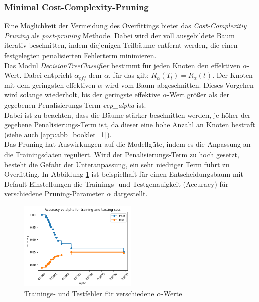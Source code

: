 
\subsubsection{Minimal Cost-Complexity-Pruning}
Eine Möglichkeit der Vermeidung des Overfittings bietet das \emph{Cost-Complexitiy Pruning} als \emph{post-pruning} Methode. Dabei wird der voll ausgebildete Baum iterativ beschnitten, indem diejenigen Teilbäume entfernt werden, die einen festgelegten penalisierten Fehlerterm minimieren.\\
\noindent \hspace*{7mm}
Das Modul \emph{DecisionTreeClassifier} bestimmt für jeden Knoten den effektiven $\alpha$-Wert. Dabei entpricht $\alpha_{eff}$ dem $\alpha$, für das gilt: $R_{\alpha}(T_{t})=R_{\alpha}(t)$. Der Knoten mit dem geringsten effektiven $\alpha$ wird vom Baum abgeschnitten. Dieses Vorgehen wird solange wiederholt, bis der geringste effektive $\alpha$-Wert größer als der gegebenen Penalisierungs-Term \emph{ccp\_alpha} ist.\\
\noindent \hspace*{7mm}
Dabei ist zu beachten, dass die Bäume stärker beschnitten werden, je höher der gegebene Penalisierungs-Term ist, da dieser eine hohe Anzahl an Knoten bestraft (siehe auch \ref{app:abb_booklet_1}).\\
\noindent \hspace*{7mm}
Das Pruning hat Auswirkungen auf die Modellgüte, indem es die Anpassung an die Trainingsdaten reguliert. Wird der Penalisierungs-Term zu hoch gesetzt, besteht die Gefahr der Unteranpassung, ein sehr niedriger Term führt zu Overfitting. In Abbildung \ref{fig:ccp_accuracyVsAlpha} ist beispielhaft für einen Entscheidungsbaum mit Default-Einstellungen die Trainings- und Testgenauigkeit (Accuracy) für verschiedene Pruning-Parameter $\alpha$ dargestellt.
\begin{figure}[h]
	\centering
	\includegraphics[width = 0.5\textwidth]{Bilder/ccp_accuracyVsAlpha.png}
	\caption{Trainings- und Testfehler für verschiedene $\alpha$-Werte}
	\label{fig:ccp_accuracyVsAlpha}
\end{figure}



